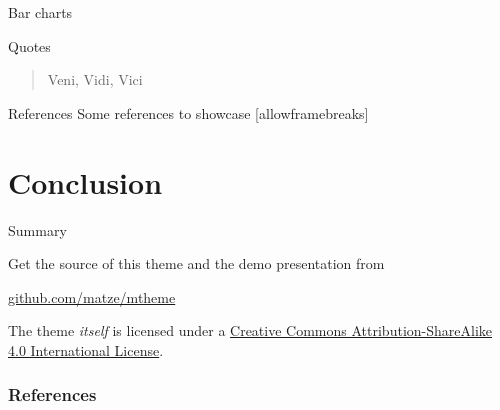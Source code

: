 \documentclass{beamer}              %
\begin{document}
\begin{frame}{Bar charts}
  \begin{figure}
  \end{figure}
\end{frame}
\begin{frame}{Quotes}
  \begin{quote}
    Veni, Vidi, Vici
  \end{quote}
\end{frame}

\begin{frame}{References}
  Some references to showcase [allowframebreaks] \cite{Schneider2015,Santos2003,Figueira2014a,Lillo-Box2015a}
\end{frame}

\section{Conclusion}

\begin{frame}{Summary}

  Get the source of this theme and the demo presentation from

  \begin{center}\url{github.com/matze/mtheme}\end{center}

  The theme \emph{itself} is licensed under a
  \href{http://creativecommons.org/licenses/by-sa/4.0/}{Creative Commons
  Attribution-ShareAlike 4.0 International License}.

  \begin{center}\ccbysa\end{center}

\end{frame}




\begin{frame}[allowframebreaks]
  \frametitle{References}
  
  
\end{frame}
\end{document}
